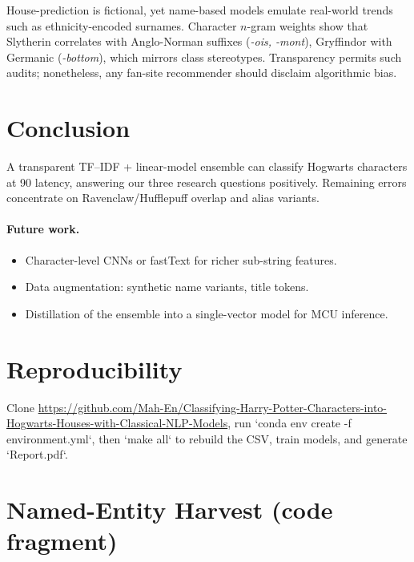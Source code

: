 \documentclass[12pt,a4paper]{article}
\begin{document}
House-prediction is fictional, yet name-based models emulate real-world
trends such as ethnicity-encoded surnames.  Character $n$-gram weights
show that Slytherin correlates with Anglo-Norman suffixes (\textit{-ois,
-mont}), Gryffindor with Germanic (\textit{-bottom}), which mirrors
class stereotypes.  Transparency permits such audits; nonetheless, any
fan-site recommender should disclaim algorithmic bias.

\section{Conclusion}\label{sec:conclusion}

A transparent TF–IDF + linear-model ensemble can classify Hogwarts
characters at 90 %
latency, answering our three research questions positively.  Remaining
errors concentrate on Ravenclaw/Hufflepuff overlap and alias variants.

\paragraph{Future work.}
\begin{itemize}[leftmargin=1.6em]
  \item Character-level CNNs or fastText for richer sub-string features.
  \item Data augmentation: synthetic name variants, title tokens.
  \item Distillation of the ensemble into a single-vector model for MCU
        inference.
\end{itemize}

\section*{Reproducibility}

Clone \url{https://github.com/Mah-En/Classifying-Harry-Potter-Characters-into-Hogwarts-Houses-with-Classical-NLP-Models},  
run `conda env create -f environment.yml`, then `make all` to rebuild the
CSV, train models, and generate `Report.pdf`.

\appendix
\section{Named-Entity Harvest (code fragment)}
\end{document}
